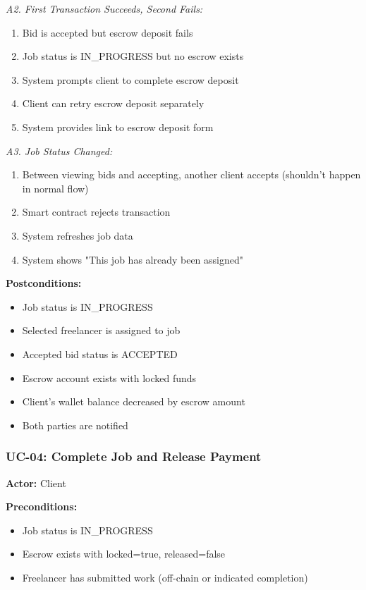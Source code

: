 \documentclass[a4paper,13pt,twoside]{report}
\theoremstyle{definition}
\begin{document}
\textit{A2. First Transaction Succeeds, Second Fails:}
\begin{enumerate}
    \item Bid is accepted but escrow deposit fails
    \item Job status is IN\_PROGRESS but no escrow exists
    \item System prompts client to complete escrow deposit
    \item Client can retry escrow deposit separately
    \item System provides link to escrow deposit form
\end{enumerate}

\textit{A3. Job Status Changed:}
\begin{enumerate}
    \item Between viewing bids and accepting, another client accepts (shouldn't happen in normal flow)
    \item Smart contract rejects transaction
    \item System refreshes job data
    \item System shows "This job has already been assigned"
\end{enumerate}

\textbf{Postconditions:}
\begin{itemize}
    \item Job status is IN\_PROGRESS
    \item Selected freelancer is assigned to job
    \item Accepted bid status is ACCEPTED
    \item Escrow account exists with locked funds
    \item Client's wallet balance decreased by escrow amount
    \item Both parties are notified
\end{itemize}

\subsubsection{UC-04: Complete Job and Release Payment}

\textbf{Actor:} Client

\textbf{Preconditions:}
\begin{itemize}
    \item Job status is IN\_PROGRESS
    \item Escrow exists with locked=true, released=false
    \item Freelancer has submitted work (off-chain or indicated completion)
\end{itemize}
\end{document}
